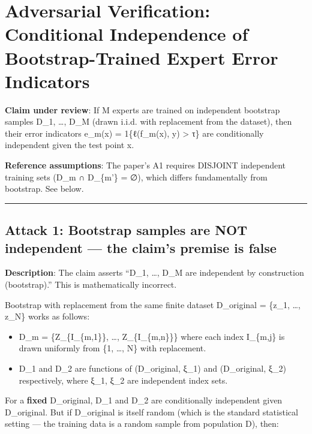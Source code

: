 \documentclass[
  12pt,
]{ctexart}
\author{SCX}
\date{2026}
\providecommand{\tightlist}{%
  \setlength{\itemsep}{0pt}\setlength{\parskip}{0pt}}
\begin{document}
\section{Adversarial Verification: Conditional Independence of
Bootstrap-Trained Expert Error
Indicators}\label{adversarial-verification-conditional-independence-of-bootstrap-trained-expert-error-indicators}

\textbf{Claim under review}: If M experts are trained on independent
bootstrap samples D\_1, \ldots, D\_M (drawn i.i.d. with replacement from
the dataset), then their error indicators e\_m(x) = 1\{ℓ(f\_m(x), y)
\textgreater{} τ\} are conditionally independent given the test point x.

\textbf{Reference assumptions}: The paper's A1 requires DISJOINT
independent training sets (D\_m ∩ D\_\{m'\} = ∅), which differs
fundamentally from bootstrap. See below.

\begin{center}\rule{0.5\linewidth}{0.5pt}\end{center}

\subsection{Attack 1: Bootstrap samples are NOT independent --- the
claim's premise is
false}\label{attack-1-bootstrap-samples-are-not-independent-the-claims-premise-is-false}

\textbf{Description}: The claim asserts ``D\_1, \ldots, D\_M are
independent by construction (bootstrap).'' This is mathematically
incorrect.

Bootstrap with replacement from the same finite dataset D\_original =
\{z\_1, \ldots, z\_N\} works as follows:

\begin{itemize}
\tightlist
\item
  D\_m = \{Z\_\{I\_\{m,1\}\}, \ldots, Z\_\{I\_\{m,n\}\}\} where each
  index I\_\{m,j\} is drawn uniformly from \{1, \ldots, N\} with
  replacement.
\item
  D\_1 and D\_2 are functions of (D\_original, ξ\_1) and (D\_original,
  ξ\_2) respectively, where ξ\_1, ξ\_2 are independent index sets.
\end{itemize}

For a \textbf{fixed} D\_original, D\_1 and D\_2 are conditionally
independent given D\_original. But if D\_original is itself random
(which is the standard statistical setting --- the training data is a
random sample from population D), then:
\end{document}
